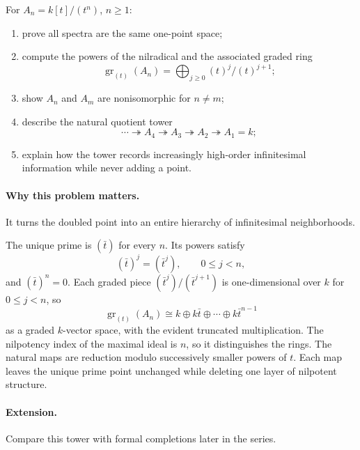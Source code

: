 \begin{problem}
For $A_n=k[t]/(t^n)$, $n\ge1$:
\begin{enumerate}
\item prove all spectra are the same one-point space;
\item compute the powers of the nilradical and the associated graded ring
\[
\operatorname{gr}_{(t)}(A_n)=\bigoplus_{j\ge0}(t)^j/(t)^{j+1};
\]
\item show $A_n$ and $A_m$ are nonisomorphic for $n\ne m$;
\item describe the natural quotient tower
\[
\cdots\twoheadrightarrow A_4\twoheadrightarrow A_3\twoheadrightarrow A_2\twoheadrightarrow A_1=k;
\]
\item explain how the tower records increasingly high-order infinitesimal information while
      never adding a point.
\end{enumerate}
\end{problem}
\paragraph{Why this problem matters.}
It turns the doubled point into an entire hierarchy of infinitesimal neighborhoods.
\begin{solution}
The unique prime is $(\bar t)$ for every $n$.  Its powers satisfy
\[
(\bar t)^j=(\bar t^j),\qquad 0\le j<n,
\]
and $(\bar t)^n=0$.  Each graded piece $(\bar t^j)/(\bar t^{j+1})$ is one-dimensional
over $k$ for $0\le j<n$, so
\[
\operatorname{gr}_{(t)}(A_n)
\cong k\oplus k\bar t\oplus\cdots\oplus k\bar t^{n-1}
\]
as a graded $k$-vector space, with the evident truncated multiplication.  The nilpotency
index of the maximal ideal is $n$, so it distinguishes the rings.  The natural maps are
reduction modulo successively smaller powers of $t$.  Each map leaves the unique prime point
unchanged while deleting one layer of nilpotent structure.
\end{solution}
\paragraph{Extension.}
Compare this tower with formal completions later in the series.
